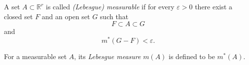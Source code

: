 A set $A \subset \mathbb{R}^r$ is called \textit{(Lebesgue) measurable} if for every $\varepsilon > 0$ there exist a closed set $F$ and an open set $G$ such that
$$
F \subset A \subset G
$$
and
$$
m^*(G - F) < \varepsilon.
$$

For a measurable set $A$, its \textit{Lebesgue measure} $m(A)$ is defined to be $m^*(A)$.
